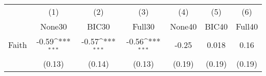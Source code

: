 {
\def\sym#1{\ifmmode^{#1}\else\(^{#1}\)\fi}
\begin{tabular}{l*{6}{c}}
\toprule
            &\multicolumn{1}{c}{(1)}&\multicolumn{1}{c}{(2)}&\multicolumn{1}{c}{(3)}&\multicolumn{1}{c}{(4)}&\multicolumn{1}{c}{(5)}&\multicolumn{1}{c}{(6)}\\
            &\multicolumn{1}{c}{None30}&\multicolumn{1}{c}{BIC30}&\multicolumn{1}{c}{Full30}&\multicolumn{1}{c}{None40}&\multicolumn{1}{c}{BIC40}&\multicolumn{1}{c}{Full40}\\
\midrule
Faith       &       -0.59\sym{***}&       -0.57\sym{***}&       -0.56\sym{***}&       -0.25         &       0.018         &        0.16         \\
            &      (0.13)         &      (0.14)         &      (0.13)         &      (0.19)         &      (0.19)         &      (0.19)         \\
\bottomrule
\end{tabular}
}
